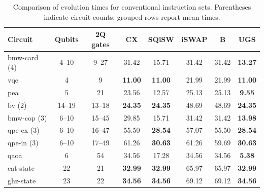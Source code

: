 \begin{table}[!tbp]\centering\color{black}
\caption{Comparison of evolution times for conventional instruction sets.  Parentheses indicate circuit counts; grouped rows report mean times.}\label{tab:1}
\vspace{2pt}
\begingroup\small
\setlength{\tabcolsep}{1pt}\renewcommand{\arraystretch}{1.08}
\begin{tabular*}{\textwidth}{@{}l@{\extracolsep{\fill}}*{7}{c}@{}}
\toprule
\textbf{Circuit} & \textbf{Qubits} & \textbf{2Q gates} & \textbf{CX} & \textbf{SQiSW} & \textbf{iSWAP} & \textbf{B} & \textbf{UGS}\\
\midrule
bmw-card (4) & 4--10 & 9--27 & 31.42 & 15.71 & 31.42 & 31.42 & \textbf{13.27} \\
vqe & 4 & 9 & \textbf{11.00} & \textbf{11.00} & 21.99 & 21.99 & \textbf{11.00} \\
pea & 5 & 21 & 23.56 & 12.57 & 25.13 & 25.13 & \textbf{9.55} \\
bv (2) & 14--19 & 13--18 & \textbf{24.35} & \textbf{24.35} & 48.69 & 48.69 & \textbf{24.35} \\
bmw-cop (3) & 6--10 & 15--45 & 29.85 & 15.71 & 31.42 & 31.42 & \textbf{13.98} \\
qpe-ex (3) & 6--10 & 16--47 & 55.50 & \textbf{28.54} & 57.07 & 55.50 & \textbf{28.54} \\
qpe-in (3) & 6--10 & 17--49 & 61.26 & \textbf{30.63} & 61.26 & 59.69 & \textbf{30.63} \\
qaoa & 6 & 54 & 34.56 & 17.28 & 34.56 & 34.56 & \textbf{5.38} \\
cat-state & 22 & 21 & \textbf{32.99} & \textbf{32.99} & 65.97 & 65.97 & \textbf{32.99} \\
ghz-state & 23 & 22 & \textbf{34.56} & \textbf{34.56} & 69.12 & 69.12 & \textbf{34.56} \\

\end{tabular*}
\end{table}
